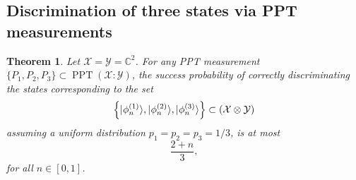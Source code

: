 \documentclass[11pt]{article}
\newtheorem{theorem}{Theorem}
\theoremstyle{definition}
\newcommand{\microspace}{\mspace{0.5mu}}
\newcommand{\ppt}{\operatorname{PPT}}
\newcommand{\ket}[1]{
  \lvert\microspace #1 \microspace \rangle}
\newcommand{\complex}{\mathbb{C}}
\newcommand{\X}{\mathcal{X}}
\newcommand{\Y}{\mathcal{Y}}
\begin{document}
\subsection*{Discrimination of three states via PPT measurements}
\label{sec:discrim-three-states-ppt-no-resource}

\begin{theorem}
    Let $\X = \Y = \complex^2$. For any PPT measurement $\{P_1, P_2, P_3\}
    \subset \ppt(\X : \Y)$, the success probability of correctly discriminating
    the states corresponding to the set 
	\begin{equation}
        \left\{ 
            \ket{\phi_n^{(1)}},
            \ket{\phi_n^{(2)}},
            \ket{\phi_n^{(3)}}
        \right\} \subset 
        \left(\X \otimes \Y \right)
	\end{equation}
    assuming a uniform distribution $p_1 = p_2 = p_3 = 1/3$, is at most
    \begin{equation}
        \frac{2 + n}{3},
    \end{equation}
    for all $n \in [0, 1]$.
\end{theorem}
\end{document}
